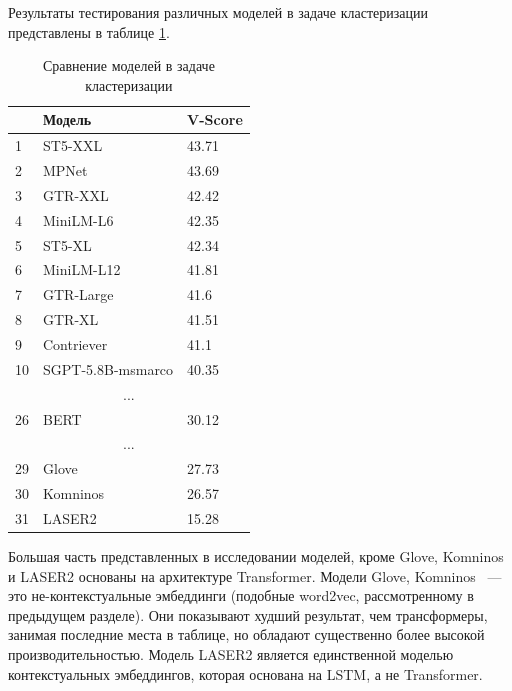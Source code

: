 Результаты тестирования различных моделей в задаче кластеризации представлены в таблице \ref{tab:mteb}.

\begin{table}[ht]
    \caption{Сравнение моделей в задаче кластеризации \cite{mteb}}
    \label{tab:mteb}
    \begin{tabularx}{\textwidth}{|l|X|X|}
        \hline
        & Модель & V-Score \\
        \hline
        1 & ST5-XXL & 43.71 \\
        \hline
        2 & MPNet & 43.69 \\
        \hline
        3 & GTR-XXL & 42.42 \\
        \hline
        4 & MiniLM-L6 & 42.35 \\
        \hline
        5 & ST5-XL & 42.34 \\
        \hline
        6 & MiniLM-L12 & 41.81 \\
        \hline
        7 & GTR-Large & 41.6 \\
        \hline
        8 & GTR-XL & 41.51 \\
        \hline
        9 & Contriever & 41.1 \\
        \hline
        10 & SGPT-5.8B-msmarco & 40.35 \\
        \hline
        \multicolumn{3}{c}{...} \\
        \hline
        26 & BERT & 30.12 \\
        \hline
        \multicolumn{3}{c}{...} \\
        \hline
        29 & Glove & 27.73 \\
        \hline
        30 & Komninos & 26.57 \\
        \hline
        31 & LASER2 & 15.28 \\
        \hline

    \end{tabularx}
\end{table}

Большая часть представленных в исследовании моделей, кроме Glove, Komninos и LASER2 основаны на архитектуре Transformer. Модели Glove, Komninos ~--- это не-контекстуальные эмбеддинги (подобные word2vec, рассмотренному в предыдущем разделе). Они показывают худший результат, чем трансформеры, занимая последние места в таблице, но обладают существенно более высокой производительностью. Модель LASER2 является единственной моделью контекстуальных эмбеддингов, которая основана на LSTM, а не Transformer.

